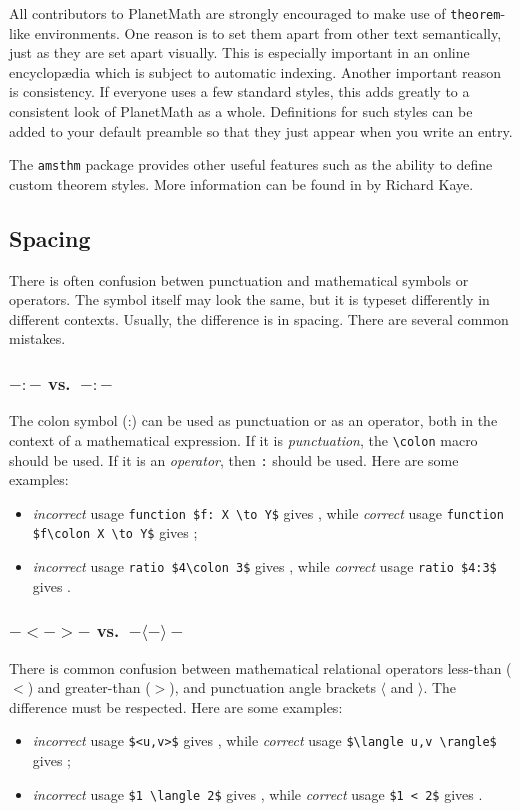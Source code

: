All contributors to PlanetMath are strongly encouraged to make use
of \texttt{theorem}-like environments. One reason is to set them apart
from other text semantically, just as they are set apart visually.
This is especially important in an online encyclop{\ae}dia which is
subject to automatic indexing. Another important reason is consistency.
If everyone uses a few standard styles, this adds greatly to
a consistent look of PlanetMath as a whole. Definitions for such styles can be added to your default preamble so that they just appear when you write an entry.

The \texttt{amsthm} package provides other useful features such as the
ability to define custom theorem styles. More information can be
found in 
by Richard Kaye.

\subsection{Spacing}
There is often confusion betwen punctuation and mathematical symbols
or operators. The symbol itself may look the same, but it is typeset
differently in different contexts. Usually, the difference is in spacing.
There are several common mistakes.
\subsubsection{${-}\colon{-}$ vs.\ ${-}:{-}$}
The colon symbol (:) can be used as punctuation or as an operator, both
in the context of a mathematical expression. If it is \emph{punctuation},
the \verb|\colon| macro should be used. If it is an \emph{operator},
then \verb|:| should be used. Here are some examples:
\begin{itemize}
\item \emph{incorrect} usage \verb|function $f: X \to Y$| gives
, while \emph{correct} usage
\verb|function $f\colon X \to Y$| gives
;
\item \emph{incorrect} usage \verb|ratio $4\colon 3$| gives
, while \emph{correct} usage
\verb|ratio $4:3$| gives .
\end{itemize}

\subsubsection{${-}<{-}>{-}$ vs.\ ${-}\langle{-}\rangle{-}$}
There is common confusion between mathematical relational operators
less-than ($<$) and greater-than ($>$), and punctuation angle brackets
$\langle$ and $\rangle$. The difference must be respected. Here are
some examples:
\begin{itemize}
\item \emph{incorrect} usage \verb|$<u,v>$| gives ,
while \emph{correct} usage \verb|$\langle u,v \rangle$| gives
;
\item \emph{incorrect} usage \verb|$1 \langle 2$| gives ,
while \emph{correct} usage \verb|$1 < 2$| gives .
\end{itemize}

